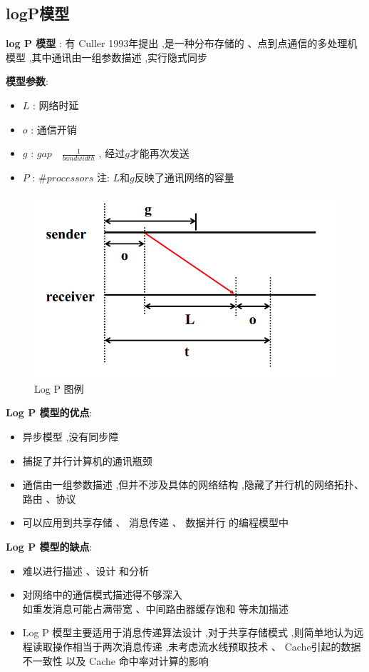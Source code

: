 \documentclass[UTF8,a4paper]{ctexart}
\begin{document}
  \subsection{logP模型}
  \textbf{log P 模型} : 有 Culler 1993年提出 ,是一种分布存储的 、点到点通信的多处理机模型 ,其中通讯由一组参数描述 ,实行隐式同步

  \textbf{模型参数}:
  \begin{itemize}
    \item $L$ : 网络时延
    \item $o$ : 通信开销
    \item $g$ : $gap \quad \frac{1}{bandwidth}$ , 经过$g$才能再次发送
    \item $P$ : $\# processors$
    注: $L$和$g$反映了通讯网络的容量
  \end{itemize}

  \begin{figure}[H]
    \centering
    \includegraphics[scale = 0.3]{assets/ParallelComputing_2f864.png}
    \caption{Log P 图例}
  \end{figure}

  \textbf{Log P 模型的优点}:
  \begin{itemize}
    \item 异步模型 ,没有同步障
    \item 捕捉了并行计算机的通讯瓶颈
    \item 通信由一组参数描述 ,但并不涉及具体的网络结构 ,隐藏了并行机的网络拓扑、路由 、协议
    \item 可以应用到共享存储 、 消息传递 、 数据并行 的编程模型中
  \end{itemize}

  \textbf{Log P 模型的缺点}:
  \begin{itemize}
    \item 难以进行描述 、设计 和分析
    \item 对网络中的通信模式描述得不够深入 \\
    如重发消息可能占满带宽 、中间路由器缓存饱和 等未加描述
    \item Log P 模型主要适用于消息传递算法设计 ,对于共享存储模式 ,则简单地认为远程读取操作相当于两次消息传递 ,未考虑流水线预取技术 、 Cache引起的数据不一致性 以及 Cache 命中率对计算的影响
  \end{itemize}
\end{document}
